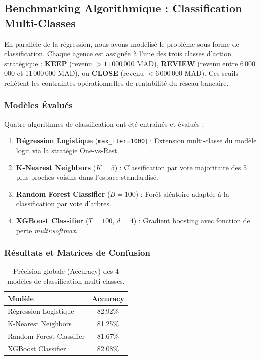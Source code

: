 \subsection{Benchmarking Algorithmique : Classification Multi-Classes}

En parallèle de la régression, nous avons modélisé le problème sous forme de classification. Chaque agence est assignée à l'une des trois classes d'action stratégique : \textbf{KEEP} (revenu $> 11\,000\,000$ MAD), \textbf{REVIEW} (revenu entre 6\,000\,000 et 11\,000\,000 MAD), ou \textbf{CLOSE} (revenu $< 6\,000\,000$ MAD). Ces seuils reflètent les contraintes opérationnelles de rentabilité du réseau bancaire.

\subsubsection{Modèles Évalués}

Quatre algorithmes de classification ont été entraînés et évalués :
\begin{enumerate}
    \item \textbf{Régression Logistique} (\texttt{max\_iter=1000}) : Extension multi-classe du modèle logit via la stratégie One-vs-Rest.
    \item \textbf{K-Nearest Neighbors} ($K=5$) : Classification par vote majoritaire des 5 plus proches voisins dans l'espace standardisé.
    \item \textbf{Random Forest Classifier} ($B=100$) : Forêt aléatoire adaptée à la classification par vote d'arbres.
    \item \textbf{XGBoost Classifier} ($T=100$, $d=4$) : Gradient boosting avec fonction de perte \textit{multi:softmax}.
\end{enumerate}

\subsubsection{Résultats et Matrices de Confusion}

\begin{table}[h]
\centering
\begin{tabular}{|l|c|}
\hline
\textbf{Modèle} & \textbf{Accuracy} \\ \hline
Régression Logistique & 82.92\% \\ \hline
K-Nearest Neighbors & 81.25\% \\ \hline
Random Forest Classifier & 81.67\% \\ \hline
XGBoost Classifier & 82.08\% \\ \hline
\end{tabular}
\caption{Précision globale (Accuracy) des 4 modèles de classification multi-classes.}
\label{tab:clf_benchmark}
\end{table}

